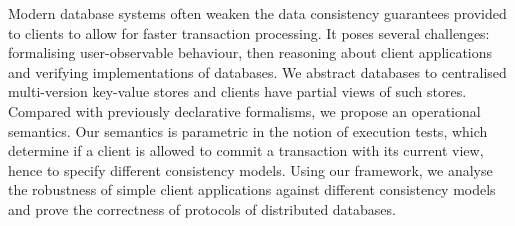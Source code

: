 Modern database systems often weaken the data consistency guarantees 
provided to clients to allow for faster transaction processing. 
It poses several challenges: formalising user-observable behaviour,
then reasoning about client applications 
and verifying implementations of databases.
We abstract databases to centralised multi-version key-value stores and 
clients have partial views of such stores.
Compared with previously declarative formalisms,
we propose an operational semantics. 
Our semantics is parametric in the notion of execution tests, 
which determine if a client is allowed to commit a transaction with its current view,
hence to specify different consistency models. 
Using our framework, 
we analyse the robustness of simple client applications 
against different consistency models and prove the correctness 
of protocols of distributed databases.
